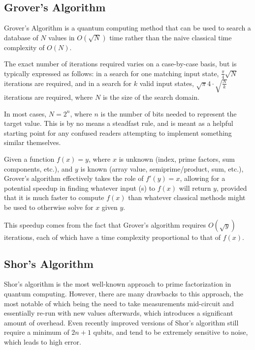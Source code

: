 \documentclass[twocolumn]{cinc}
\begin{document}
  \subsection{Grover's Algorithm}

  Grover's Algorithm is a quantum computing method 
  that can be used to search a database of $N$ values in $O(\sqrt{N})$ time 
  rather than the naive classical time complexity of $O(N)$\cite{grover}. 

  The exact number of iterations required varies on a case-by-case basis,
  but is typically expressed as follows: in a search for one matching input
  state, $\frac{\pi}{4}\sqrt{N}$ iterations are required, and in a search
  for $k$ valid input states, $\sqrt{\pi}{4}\cdot \sqrt{\frac{N}{k}}$
  iterations are required, where $N$ is the size of the search domain.

  In most cases, $N=2^n$, where $n$ is the number of bits needed to represent
  the target value. This is by no means a steadfast rule, and is meant as 
  a helpful starting point for any confused readers attempting to implement
  something similar themselves.
  
  Given a function $f(x)=y$, where $x$ is unknown (index, prime factors, 
  sum components, etc.), and $y$ is known (array value, semiprime/product, 
  sum, etc.), Grover's algorithm effectively takes the role of $f'(y)=x$, 
  allowing for a potential speedup in finding whatever input (s) to $f(x)$
  will return $y$, provided that it is much faster to compute $f(x)$ than
  whatever classical methods might be used to otherwise solve for $x$ given $y$.

  This speedup comes from the fact that Grover's algorithm requires 
  $O(\sqrt{y})$ iterations, each of which have a time complexity proportional
  to that of $f(x)$.

  \subsection{Shor's Algorithm}

  Shor's algorithm is the most well-known approach to prime factorization
  in quantum computing. However, there are many drawbacks to this approach,
  the most notable of which being the need to take measurements mid-circuit
  and essentially re-run with new values afterwards, which introduces a 
  significant amount of overhead. Even recently improved versions of Shor's
  algorithm still require a minimum of $2n+1$ qubits, and tend to be 
  extremely sensitive to noise, which leads to high error\cite{quantum_factoring,shor}.
\end{document}
